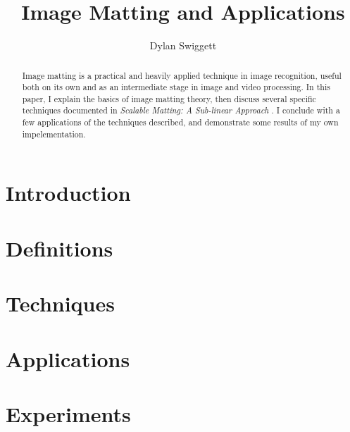 \documentclass[10pt,a4paper]{article}
\author{Dylan Swiggett}
\title{Image Matting and Applications}
\begin{document}
\maketitle

\begin{abstract}
Image matting is a practical and heavily applied technique in image recognition, useful both on its own and as an intermediate stage in image and video processing. In this paper, I explain the basics of image matting theory, then discuss several specific techniques documented in \textit{Scalable Matting: A Sub-linear Approach} \cite{lee14}. I conclude with a few applications of the techniques described, and demonstrate some results of my own impelementation.
\end{abstract}

\tableofcontents
\pagebreak

\section{Introduction}

\section{Definitions}

\section{Techniques}
\section{Applications}
\section{Experiments}

\pagebreak

\end{document}
